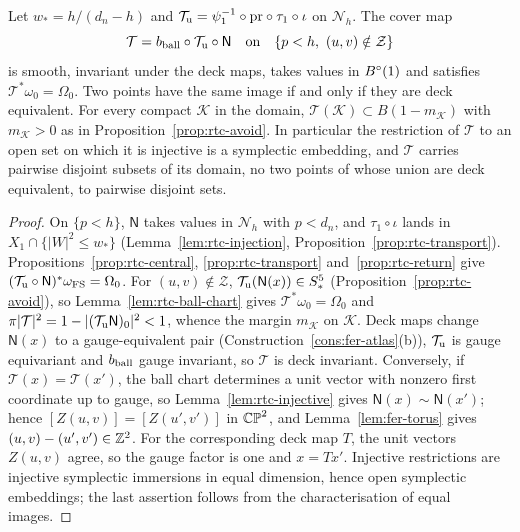 \begin{theorem}\label{thm:rtc-transfer}\label{thm:cub-transfer}
Let $w_*=h/(d_n-h)$ and $\mathcal T_{\rm u}=\psi_1^{-1}\circ\mathrm{pr}\circ\tau_1\circ\iota$ on $\mathcal N_h$. The cover map
\[
 \mathcal T=b_{\rm ball}\circ\mathcal T_{\rm u}\circ\mathsf N
 \quad\text{on}\quad\{p<h,\ (u,v)\notin\mathcal Z\}
\]
is smooth, invariant under the deck maps, takes values in $B^{\circ}(1)$ and satisfies $\mathcal T^*\omega_0=\Omega_0$. Two points
have the same image if and only if they are deck equivalent. For every compact $\mathcal K$ in the domain,
$\mathcal T(\mathcal K)\subset B(1-m_{\mathcal K})$ with $m_{\mathcal K}>0$ as in Proposition~\ref{prop:rtc-avoid}. In particular the
restriction of $\mathcal T$ to an open set on which it is injective is a symplectic embedding, and $\mathcal T$ carries
pairwise disjoint subsets of its domain, no two points of whose union are deck equivalent, to pairwise disjoint sets.
\end{theorem}

\begin{proof}
On $\{p<h\}$, $\mathsf N$ takes values in $\mathcal N_h$ with $p<d_n$, and $\tau_1\circ\iota$ lands in $X_1\cap\{|W|^2\le w_*\}$ (Lemma~\ref{lem:rtc-injection}, Proposition~\ref{prop:rtc-transport}). Propositions~\ref{prop:rtc-central}, \ref{prop:rtc-transport} and~\ref{prop:rtc-return} give $(\mathcal T_{\rm u}\circ\mathsf N)^*\omega_{\rm FS}=\Omega_0$. For $(u,v)\notin\mathcal Z$, $\mathcal T_{\rm u}(\mathsf N(x))\in S^5_*$ (Proposition~\ref{prop:rtc-avoid}), so Lemma~\ref{lem:rtc-ball-chart} gives $\mathcal T^*\omega_0=\Omega_0$ and $\pi|\mathcal T|^2=1-|(\mathcal T_{\rm u}\mathsf N)_0|^2<1$, whence the margin $m_{\mathcal K}$ on $\mathcal K$. Deck maps change $\mathsf N(x)$ to a gauge-equivalent pair (Construction~\ref{cons:fer-atlas}(b)), $\mathcal T_{\rm u}$ is gauge equivariant and $b_{\rm ball}$ gauge invariant, so $\mathcal T$ is deck invariant. Conversely, if $\mathcal T(x)=\mathcal T(x')$, the ball chart determines a unit vector with nonzero first coordinate up to gauge, so Lemma~\ref{lem:rtc-injective} gives $\mathsf N(x)\sim\mathsf N(x')$; hence $[Z(u,v)]=[Z(u',v')]$ in $\mathbb{CP}^2$, and Lemma~\ref{lem:fer-torus} gives $(u,v)-(u',v')\in\mathbb{Z}^2$. For the corresponding deck map $T$, the unit vectors $Z(u,v)$ agree, so the gauge factor is one and $x=Tx'$. Injective restrictions are injective symplectic immersions in equal dimension, hence open symplectic embeddings; the last assertion follows from the characterisation of equal images.
\end{proof}


